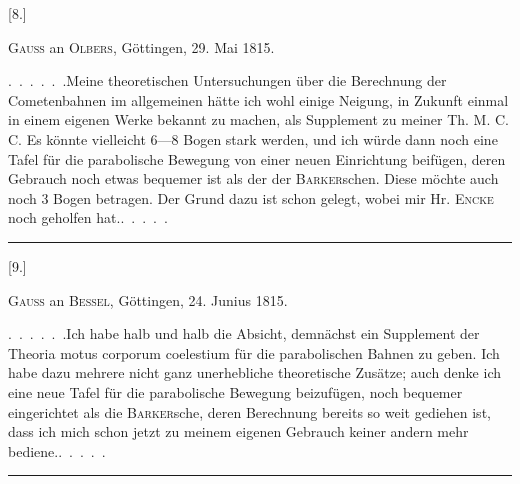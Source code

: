 \clearpage
{}
\begin{center}
[8.]\par
\medskip
\textsc{Gauss} an \textsc{Olbers}, Göttingen, 29. Mai 1815.
\end{center}
\noindent\hspace*{\parindent}.\ .\ .\ .\ .\ .\quad Meine theoretischen Untersuchungen über die Berechnung der Cometenbahnen im allgemeinen hätte ich wohl einige Neigung, in Zukunft einmal in einem eigenen Werke bekannt zu machen, als Supplement zu meiner Th. M. C. C. Es könnte vielleicht 6—8 Bogen stark werden, und ich würde dann noch eine Tafel für die parabolische Bewegung von einer neuen Einrichtung beifügen, deren Gebrauch noch etwas bequemer ist als der der \textsc{Barker}schen. Diese möchte auch noch 3 Bogen betragen. Der Grund dazu ist schon gelegt, wobei mir Hr. \textsc{Encke} noch geholfen hat.\quad .\ .\ .\ .\ .
\par\medskip
\begin{center}\rule{.18\textwidth}{.4pt}\end{center}
\medskip
{}
\begin{center}
[9.]\par
\medskip
\textsc{Gauss} an \textsc{Bessel}, Göttingen, 24. Junius 1815.
\end{center}
\noindent\hspace*{\parindent}.\ .\ .\ .\ .\ .\quad Ich habe halb und halb die Absicht, demnächst ein Supplement der Theoria motus corporum coelestium für die parabolischen Bahnen zu geben. Ich habe dazu mehrere nicht ganz unerhebliche theoretische Zusätze; auch denke ich eine neue Tafel für die parabolische Bewegung beizufügen, noch bequemer eingerichtet als die \textsc{Barker}sche, deren Berechnung bereits so weit gediehen ist, dass ich mich schon jetzt zu meinem eigenen Gebrauch keiner andern mehr bediene.\quad .\ .\ .\ .\ .
\par\medskip
\begin{center}\rule{.22\textwidth}{.4pt}\end{center}
